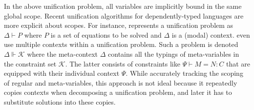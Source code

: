 In the above unification problem, all variables are implicitly bound in the same
global scope. Recent unification algorithms for dependently-typed languages
are more explicit about scopes. For instance, \citet{Reed2009} represents a unification
problem as $\Delta \vdash P$ where $P$ is a set of equations to be solved and $\Delta$ is
a (modal) context. \citet{Abel2011higher} even use multiple contexts within a unification problem.
Such a problem is denoted $\Delta \Vdash \mathcal{K}$ where the meta-context
$\Delta$ contains all the typings of meta-variables in the constraint set
$\mathcal{K}$. The latter consists of constraints like $\Psi \vdash M = N : C$
that are equipped with their individual context $\Psi$. While accurately tracking
the scoping of regular and meta-variables, this approach is not ideal because it
repeatedly copies contexts when decomposing a unification problem, and
later it has to 
substitute solutions into these copies.

